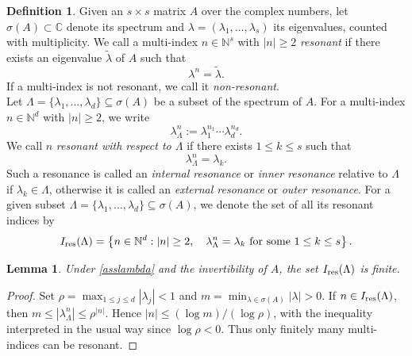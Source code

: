 \documentclass{amsart}
\theoremstyle{plain}
\newtheorem{lemma}[theorem]{Lemma}
\theoremstyle{definition}
\newtheorem{definition}[theorem]{Definition}
\begin{document}
\begin{definition}\label{def_resonances}
Given an $s\times s$ matrix $A$ over the complex numbers, let $\sigma(A)\subset\mathbb{C}$ denote its spectrum and $\lambda=(\lambda_1,\ldots,\lambda_s)$ its eigenvalues, counted with multiplicity. We call a multi-index $n\in\mathbb{N}^s$ with $|n|\geq 2$ \emph{resonant} if there exists an eigenvalue $\widetilde{\lambda}$ of $A$ such that
\begin{equation}\label{lambdares}
    \lambda^n=\widetilde{\lambda}.
\end{equation}
If a multi-index is not resonant, we call it \emph{non-resonant}.\\

Let $\Lambda=\{\lambda_1,\ldots,\lambda_d\}\subseteq\sigma(A)$ be a subset of the spectrum of $A$. For a multi-index $n\in\mathbb{N}^d$ with $|n|\geq 2$, we write
\begin{equation}
    \lambda_\Lambda^n:=\lambda_1^{n_1}\cdots\lambda_d^{n_d}.
\end{equation}
We call $n$ \emph{resonant with respect to $\Lambda$} if there exists $1\leq k\leq s$ such that
\begin{equation}\label{lambdaresLambda}
    \lambda_\Lambda^n=\lambda_k.
\end{equation}
Such a resonance is called an \emph{internal resonance} or \emph{inner resonance} relative to $\Lambda$ if $\lambda_k\in\Lambda$, otherwise it is called an \emph{external resonance} or \emph{outer resonance}. For a given subset $\Lambda=\{\lambda_1,\ldots,\lambda_d\}\subseteq\sigma(A)$, we denote the set of all its resonant indices by
\begin{equation}\label{def_I_res}
    I_{\rm res}(\Lambda)
    =
    \left\{
        n\in\mathbb{N}^d :
        |n|\geq2,\quad
        \lambda_\Lambda^n=\lambda_k
        \text{ for some } 1\leq k\leq s
    \right\}.
\end{equation}
\end{definition}

\begin{lemma}\label{lemma_finite_resonances}
Under \eqref{asslambda} and the invertibility of $A$, the set $I_{\rm res}(\Lambda)$ is finite.
\end{lemma}
\begin{proof}
Set $\rho=\max_{1\leq j\leq d}|\lambda_j|<1$ and $m=\min_{\lambda\in\sigma(A)}|\lambda|>0$. If $n\in I_{\rm res}(\Lambda)$, then $m\leq|\lambda_\Lambda^n|\leq\rho^{|n|}$. Hence $|n|\leq (\log m)/(\log\rho)$, with the inequality interpreted in the usual way since $\log\rho<0$. Thus only finitely many multi-indices can be resonant.
\end{proof}
\end{document}
